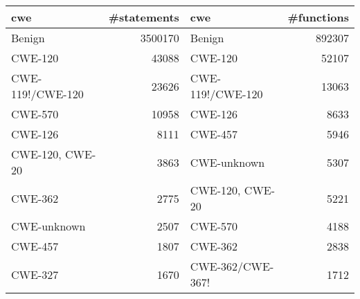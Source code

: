 \begin{tabular}{lrlr}
\toprule
cwe & #statements & cwe & #functions \\
\midrule
Benign & 3500170 & Benign & 892307 \\
CWE-120 & 43088 & CWE-120 & 52107 \\
CWE-119!/CWE-120 & 23626 & CWE-119!/CWE-120 & 13063 \\
CWE-570 & 10958 & CWE-126 & 8633 \\
CWE-126 & 8111 & CWE-457 & 5946 \\
CWE-120, CWE-20 & 3863 & CWE-unknown & 5307 \\
CWE-362 & 2775 & CWE-120, CWE-20 & 5221 \\
CWE-unknown & 2507 & CWE-570 & 4188 \\
CWE-457 & 1807 & CWE-362 & 2838 \\
CWE-327 & 1670 & CWE-362/CWE-367! & 1712 \\
\bottomrule
\end{tabular}
